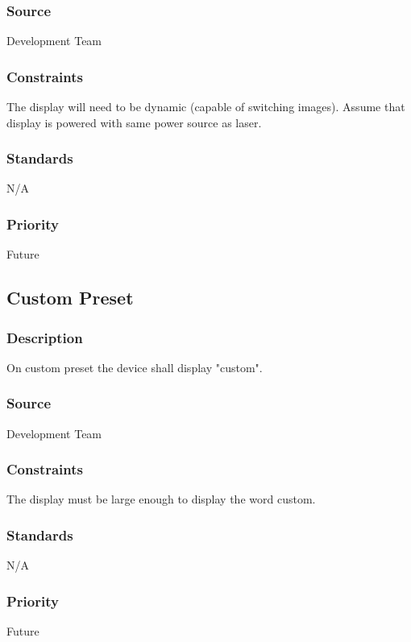 \subsubsection{Source}
Development Team
\subsubsection{Constraints}
The display will need to be dynamic (capable of switching images). Assume that display is powered with same power source as laser.
\subsubsection{Standards}
N/A
\subsubsection{Priority}
Future

\subsection{Custom Preset}
\subsubsection{Description}
On custom preset the device shall display "custom".
\subsubsection{Source}
Development Team
\subsubsection{Constraints}
The display must be large enough to display the word custom.
\subsubsection{Standards}
N/A
\subsubsection{Priority}
Future